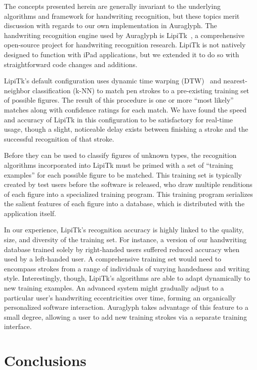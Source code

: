 \documentclass{nime-alternate}
\begin{document}
The concepts presented herein are generally invariant to the underlying algorithms and framework for handwriting recognition, but these topics merit discussion with regards to our own implementation in Auraglyph. 
The handwriting recognition engine used by Auraglyph is LipiTk~\cite{madhvanath2007lipitk}, a comprehensive open-source project for handwriting recognition research. 
LipiTk is not natively designed to function with iPad applications, but we extended it to do so with straightforward code changes and additions. 

LipiTk's default configuration uses dynamic time warping (DTW)~\cite{niels2005using} and nearest-neighbor classification (k-NN) to match pen strokes to a pre-existing training set of possible figures. 
The result of this procedure is one or more ``most likely'' matches along with confidence ratings for each match. 
We have found the speed and accuracy of LipiTk in this configuration to be satisfactory for real-time usage, though a slight, noticeable delay exists between finishing a stroke and the successful recognition of that stroke. 

Before they can be used to classify figures of unknown types, the recognition algorithms incorporated into LipiTk must be primed with a set of ``training examples'' for each possible figure to be matched. 
This training set is typically created by test users before the software is released, who draw multiple renditions of each figure into a specialized training program. 
This training program serializes the salient features of each figure into a database, which is distributed with the application itself. 

In our experience, LipiTk's recognition accuracy is highly linked to the quality, size, and diversity of the training set. 
For instance, a version of our handwriting database trained solely by right-handed users suffered reduced accuracy when used by a left-handed user. 
A comprehensive training set would need to encompass strokes from a range of individuals of varying handedness and writing style. 
Interestingly, though, LipiTk's algorithms are able to adapt dynamically to new training examples. 
An advanced system might gradually adjust to a particular user's handwriting eccentricities over time, forming an organically personalized software interaction. 
Auraglyph takes advantage of this feature to a small degree, allowing a user to add new training strokes via a separate training interface. 

\section{Conclusions}
\label{sec:Conclusions}
\end{document}
